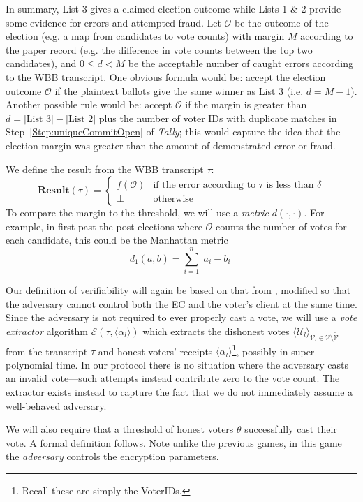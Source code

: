 \documentclass[12pt,a4paper]{article}
\theoremstyle{definition}
\begin{document}
In summary, List 3 gives a claimed election outcome while Lists 1 \& 2 provide some evidence for errors and attempted fraud. Let $\mathcal{O}$ be the outcome of the election (e.g. a map from candidates to vote counts) with margin $M$ according to the paper record (e.g. the difference in vote counts between the top two candidates), and $0 \leq d < M$ be the acceptable number of caught errors according to the WBB transcript. One obvious formula would be: accept the election outcome $\mathcal{O}$ if the plaintext ballots give the same winner as List 3 (i.e. $d = M - 1$).  Another possible rule would be: accept $\mathcal{O}$ if the margin is greater than
$d = |\text{List 3}| - |\text{List 2}|$ 
plus the number of voter IDs with duplicate matches in Step~\ref{Step:uniqueCommitOpen} of \textit{Tally}; this would capture the idea that the election margin was greater than the amount of demonstrated error or fraud.

We define the result from the WBB transcript $\tau$:
$$\mathbf{Result}(\tau)=
\begin{cases}
    f(\mathcal{O})  &   \text{if the error according to }\tau\text{ is less than }\delta\\
    \bot            &   \text{otherwise}
\end{cases}$$
To compare the margin to the threshold, we will use a \textit{metric} $d(\cdot,\cdot)$. For example, in first-past-the-post elections where $\mathcal{O}$ counts the number of votes for each candidate, this could be the Manhattan metric
$$d_1(a, b)=\sum_{i=1}^n |a_i-b_i|$$

Our definition of verifiability will again be based on that from \cite{kiayias2015end}, modified so that the adversary cannot control both the EC and the voter's client at the same time. Since the adversary is not required to ever properly cast a vote, we will use a \textit{vote extractor} algorithm $\mathcal{E}\left(\tau, \langle \alpha_l \rangle\right)$ which extracts the dishonest votes $\langle \mathcal{U}_l \rangle_{\mathcal{V}_l\in\mathcal{V}\setminus\tilde{\mathcal{V}}}$ from the transcript $\tau$ and honest voters' receipts $\langle \alpha_l \rangle$\footnote{Recall these are simply the VoterIDs.}, possibly in super-polynomial time. In our protocol there is no situation where the adversary casts an invalid vote---such attempts instead contribute zero to the vote count. The extractor exists instead to capture the fact that we do not immediately assume a well-behaved adversary.

We will also require that a threshold of honest voters $\theta$ successfully cast their vote. A formal definition follows. Note unlike the previous games, in this game the \textit{adversary} controls the encryption parameters.
\end{document}
